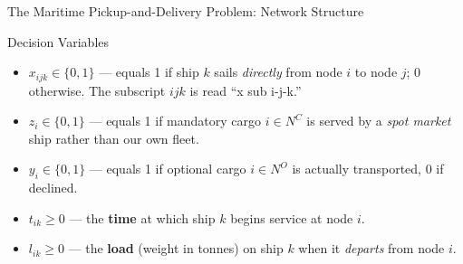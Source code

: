 \documentclass[aspectratio=169,10pt]{beamer}
\begin{document}
\begin{frame}[allowframebreaks]{The Maritime Pickup-and-Delivery Problem: Network Structure}
  \begin{block}{Decision Variables}
    \begin{itemize}
      \item $x_{ijk} \in \{0, 1\}$ --- equals 1 if ship $k$ sails \emph{directly}
            from node $i$ to node $j$; 0 otherwise.
            The subscript $ijk$ is read ``x sub i-j-k.''
      \item $z_i \in \{0, 1\}$ --- equals 1 if mandatory cargo $i \in N^C$
            is served by a \emph{spot market} ship rather than our own fleet.
      \item $y_i \in \{0, 1\}$ --- equals 1 if optional cargo $i \in N^O$ is
            actually transported, 0 if declined.
      \item $t_{ik} \geq 0$ --- the \textbf{time} at which ship $k$ begins
            service at node $i$.
      \item $l_{ik} \geq 0$ --- the \textbf{load} (weight in tonnes) on ship
            $k$ when it \emph{departs} from node $i$.
    \end{itemize}
  \end{block}
\end{frame}
\end{document}
